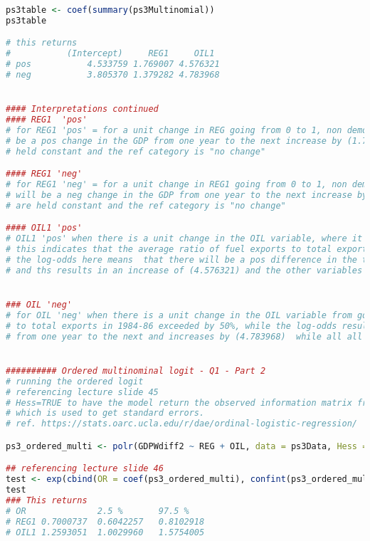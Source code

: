 \documentclass[12pt,letterpaper]{article}
\begin{document}
\begin{enumerate}
\begin{lstlisting}[language=R]
ps3table <- coef(summary(ps3Multinomial))
ps3table

# this returns
#           (Intercept)     REG1     OIL1
# pos           4.533759 1.769007 4.576321
# neg           3.805370 1.379282 4.783968


#### Interpretations continued
#### REG1  'pos' 
# for REG1 'pos' = for a unit change in REG going from 0 to 1, non democracy to a democracy, the log-odds are that there will 
# be a pos change in the GDP from one year to the next increase by (1.769007) when all other variables in the multinom_model are
# held constant and the ref category is "no change" 

#### REG1 'neg'
# for REG1 'neg' = for a unit change in REG1 going from 0 to 1, non democracy to a democracy, the log-odds are that there 
# will be a neg change in the GDP from one year to the next increase by (1.379282) when all other variables in the multinom_model
# are held constant and the ref category is "no change"

#### OIL1 'pos'
# OIL1 'pos' when there is a unit change in the OIL variable, where it increases from 0 to 1
# this indicates that the average ratio of fuel exports to total exports in 1984-86 exceeded by 50% 
# the log-odds here means  that there will be a pos difference in the total GDP in a COUNTRY from one year to the next year
# and ths results in an increase of (4.576321) and the other variables in the model are held constant


### OIL 'neg'
# for OIL 'neg' when there is a unit change in the OIL variable from going from 0 to 1, then the average ratio of fuel exports 
# to total exports in 1984-86 exceeded by 50%, while the log-odds results in a neg difference in the total GDP of a country 
# from one year to the next and increases by (4.783968)  while all all other variables are held constant


########## Ordered multinominal logit - Q1 - Part 2
# running the ordered logit
# referencing lecture slide 45
# Hess=TRUE to have the model return the observed information matrix from optimization (called the Hessian) 
# which is used to get standard errors.
# ref. https://stats.oarc.ucla.edu/r/dae/ordinal-logistic-regression/

ps3_ordered_multi <- polr(GDPWdiff2 ~ REG + OIL, data = ps3Data, Hess = T)

## referencing lecture slide 46 
test <- exp(cbind(OR = coef(ps3_ordered_multi), confint(ps3_ordered_multi))) # odds ratio
test
### This returns 
# OR              2.5 %       97.5 %
# REG1 0.7000737  0.6042257   0.8102918
# OIL1 1.2593051  1.0029960   1.5754005




\end{lstlisting}
\end{enumerate}
\end{document}
